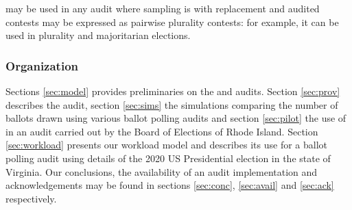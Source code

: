 \Providence may be used in any audit where sampling is with replacement and audited contests may be expressed as pairwise plurality contests: for example, it can be used in plurality and majoritarian elections. 


\subsubsection{Organization} 
Sections \ref{sec:model} provides preliminaries on the \BRAVO and \Minerva audits. Section \ref{sec:prov} describes the \Providence audit, section \ref{sec:sims} the simulations comparing the number of ballots drawn using various ballot polling audits and section \ref{sec:pilot} the use of \Providence in an audit carried out by the Board of Elections of Rhode Island. Section \ref{sec:workload} presents our workload model and describes its use for a ballot polling audit using details of the 2020 US Presidential election in the state of Virginia. Our conclusions, the availability of an audit implementation and acknowledgements may be found in sections \ref{sec:conc}, \ref{sec:avail} and \ref{sec:ack} respectively. 

